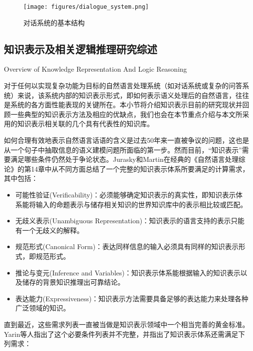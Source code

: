 \begin{figure}[htb]
\centering
\texttt{[image: figures/dialogue\_system.png]}
\caption{对话系统的基本结构}
\label{fig:dialogue}
\end{figure}


\subsection{知识表示及相关逻辑推理研究综述}{Overview of Knowledge Representation And Logic Reasoning}
\label{sec:representationReview}

对于任何以实现复杂功能为目标的自然语言处理系统（如对话系统或复杂的问答系统）来说，该系统内部的知识表示形式，即如何表示语义处理后的自然语言，往往是系统的各方面性能表现的关键所在。本小节将介绍知识表示目前的研究现状并回顾一些典型的知识表示方法及相应的优缺点，我们也会在本节重点介绍与本文所采用的知识表示相关联的几个具有代表性的知识库。

如何合理有效地表示自然语言话语的含义是过去50年来一直被争议的问题，这也是从一个句子中抽取信息的语义建模问题所面临的第一步。然而目前，“知识表示”需要满足哪些条件仍然处于争论状态。Jurasky和Martin在经典的《自然语言处理综论》\cite{Jurafsky2009}的第14章中从不同方面总结了一个完整的知识表示体系所要满足的计算需求，其中包括：

\begin{itemize}
\item 可能性验证(Verificability)：必须能够确定知识表示的真实性，即知识表示体系能将输入的命题表示与储存相关知识的世界知识库中的表示相比较或匹配。
\item 无歧义表示(Unambiguous Representation)：知识表示的语言支持的表示只能有一个无歧义的解释。
\item 规范形式(Canonical Form)：表达同样信息的输入必须具有同样的知识表示形式，即规范形式。
\item 推论与变元(Inference and Variables)：知识表示体系能根据输入的知识表示以及储存的背景知识推理出可靠结论。
\item 表达能力(Expressiveness)：知识表示方法需要具备足够的表达能力来处理各种广泛领域的知识。
\end{itemize}

直到最近，这些需求列表一直被当做是知识表示领域中一个相当完善的黄金标准。Yarin等人\cite{Yarin2013}指出了这个必要条件列表并不完整，并指出了知识表示体系还需满足下列需求：

